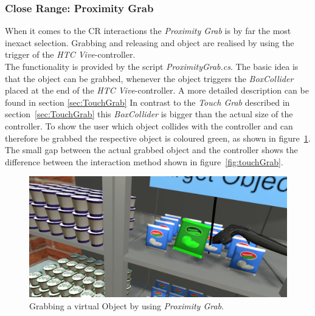 \subsubsection{Close Range: Proximity Grab} \label{sec:ProximityGrab}
When it comes to the CR interactions the \textit{Proximity Grab} is by far the most inexact selection. Grabbing and releasing and object are realised by using the trigger of the \textit{HTC Vive}-controller.  \\
The functionality is provided by the script \textit{ProximityGrab.cs}. The basic idea is that the object can be grabbed, whenever the object triggers the \textit{BoxCollider} \cite{website:BoxCollider} placed at the end of the \textit{HTC Vive}-controller. A more detailed description can be found in section \ref{sec:TouchGrab} In contrast to the \textit{Touch Grab} described in section~\ref{sec:TouchGrab} this \textit{BoxCollider} is bigger than the actual size of the controller. To show the user which object collides with the controller and can therefore be grabbed the respective object is coloured green, as shown in figure~\ref{fig:proximityGrab}. The small gap between the actual grabbed object and the controller shows the difference between the interaction method shown in figure~\ref{fig:touchGrab}.

\begin{figure}[H] 
	\center 
	\includegraphics[width=12cm]{Images/ProximityGrab.PNG}			
	\caption[Grabbing a virtual Object by using \textit{Proximity Grab}.]{Grabbing a virtual Object by using \textit{Proximity Grab}.}
	\label{fig:proximityGrab}
\end{figure}



